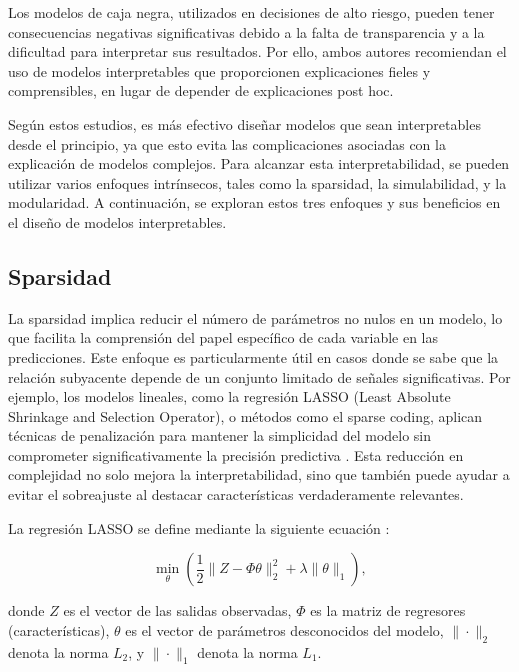 Los modelos de caja negra, utilizados en decisiones de alto riesgo, pueden tener consecuencias negativas significativas debido a la falta de transparencia y a la dificultad para interpretar sus resultados. Por ello, ambos autores recomiendan el uso de modelos interpretables que proporcionen explicaciones fieles y comprensibles, en lugar de depender de explicaciones post hoc.

Según estos estudios, es más efectivo diseñar modelos que sean interpretables desde el principio, ya que esto evita las complicaciones asociadas con la explicación de modelos complejos. Para alcanzar esta interpretabilidad, se pueden utilizar varios enfoques intrínsecos, tales como la sparsidad, la simulabilidad, y la modularidad. A continuación, se exploran estos tres enfoques y sus beneficios en el diseño de modelos interpretables.

\subsection{Sparsidad}

La sparsidad implica reducir el número de parámetros no nulos en un modelo, lo que facilita la comprensión del papel específico de cada variable en las predicciones. Este enfoque es particularmente útil en casos donde se sabe que la relación subyacente depende de un conjunto limitado de señales significativas. Por ejemplo, los modelos lineales, como la regresión LASSO (Least Absolute Shrinkage and Selection Operator), o métodos como el sparse coding, aplican técnicas de penalización para mantener la simplicidad del modelo sin comprometer significativamente la precisión predictiva \cite{kukreja2006least}. Esta reducción en complejidad no solo mejora la interpretabilidad, sino que también puede ayudar a evitar el sobreajuste al destacar características verdaderamente relevantes.

La regresión LASSO se define mediante la siguiente ecuación \cite{kukreja2006least}:

\begin{equation}
\min_{\theta} \left( \frac{1}{2} \|Z - \Phi \theta \|_2^2 + \lambda \|\theta\|_1 \right),
\end{equation}

donde \(Z\) es el vector de las salidas observadas, \(\Phi\) es la matriz de regresores (características), \(\theta\) es el vector de parámetros desconocidos del modelo, \(\| \cdot \|_2\) denota la norma \(L_2\), y \(\| \cdot \|_1\) denota la norma \(L_1\).

